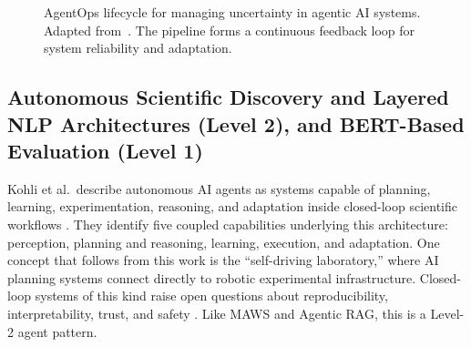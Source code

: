 \documentclass[sn-basic,Numbered]{sn-jnl}
\begin{document}
\begin{figure}[t]
\centering
{}
\caption{AgentOps lifecycle for managing uncertainty in agentic AI
systems. Adapted from~\cite{moshkovich2025agentops}. The pipeline forms
a continuous feedback loop for system reliability and adaptation.}
\label{fig:agentops}
\end{figure}

\subsection{Autonomous Scientific Discovery and Layered NLP Architectures (Level 2), and BERT-Based Evaluation (Level 1)}
\label{sec:autonomous}

Kohli et al.\ describe autonomous AI agents as systems capable of
planning, learning, experimentation, reasoning, and adaptation inside
closed-loop scientific workflows \cite{kohli2025autonomous}. They
identify five coupled capabilities underlying this architecture:
perception, planning and reasoning, learning, execution, and
adaptation. One concept that follows from this work is the
``self-driving laboratory,'' where AI planning systems connect
directly to robotic experimental infrastructure. Closed-loop systems
of this kind raise open questions about reproducibility,
interpretability, trust, and safety \cite{kohli2025autonomous}. Like
MAWS and Agentic RAG, this is a Level-2 agent pattern.
\end{document}
